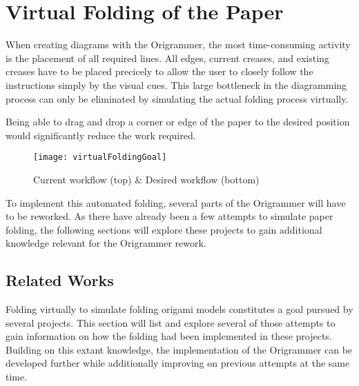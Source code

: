 
\section{Virtual Folding of the Paper}
\label{sec:virtualFolding}

When creating diagrams with the Origrammer, the most time-consuming activity is the placement of all required lines. All edges, current creases, and existing creases have to be placed precicely to allow the user to closely follow the instructions simply by the visual cues. This large bottleneck in the diagramming process can only be eliminated by simulating the actual folding process virtually.

Being able to drag and drop a corner or edge of the paper to the desired position would significantly reduce the work required.

 \begin{figure}[htbp]
	\centering
	\texttt{[image: virtualFoldingGoal]}
	\caption{Current workflow (top) \& Desired workflow (bottom)}
	\label{fig:virtualFoldingGoal}
\end{figure}

\noindent To implement this automated folding, several parts of the Origrammer will have to be reworked. As there have already been a few attempts to simulate paper folding, the following sections will explore these projects to gain additional knowledge relevant for the Origrammer rework.


\subsection{Related Works}
Folding virtually to simulate folding origami models constitutes a goal pursued by several projects. This section will list and explore several of those attempts to gain information on how the folding had been implemented in these projects. Building on this extant knowledge, the implementation of the Origrammer can be developed further while additionally improving on previous attempts at the same time.

